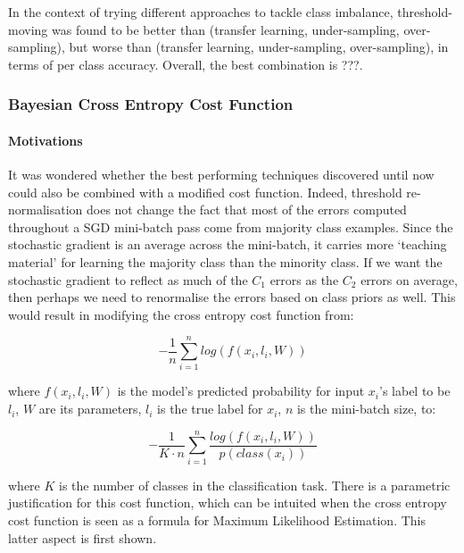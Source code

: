 \documentclass[a4paper,11pt]{article}
\begin{document}
In the context of trying different approaches to tackle class imbalance, threshold-moving was found to be better than (transfer learning, under-sampling, over-sampling), but worse than (transfer learning, under-sampling, over-sampling), in terms of per class accuracy. Overall, the best combination is ???.


\subsubsection{Bayesian Cross Entropy Cost Function}

\paragraph{Motivations}
It was wondered whether the best performing techniques discovered until now could also be combined with a modified cost function. Indeed, threshold re-normalisation does not change the fact that most of the errors computed throughout a SGD mini-batch pass come from majority class examples. Since the stochastic gradient is an average across the mini-batch, it carries more `teaching material' for learning the majority class than the minority class. If we want the stochastic gradient to reflect as much of the $C_1$ errors as the $C_2$ errors on average, then perhaps we need to renormalise the errors based on class priors as well. This would result in modifying the cross entropy cost function from: 

\begin{equation}
-\frac{1}{n}\sum\limits_{i=1}^{n} log(f(x_i,l_i,W))
\end{equation}

where $f(x_i,l_i,W)$ is the model's predicted probability for input $x_i$'s label to be $l_i$, $W$ are its parameters, $l_i$ is the true label for $x_i$, $n$ is the mini-batch size, to:

\begin{equation}
-\frac{1}{K \cdot n}\sum\limits_{i=1}^{n} \frac{log(f(x_i,l_i,W))}{p(class(x_i))} 
\end{equation}

where $K$ is the number of classes in the classification task.
There is a parametric justification for this cost function, which can be intuited when the cross entropy cost function is seen as a formula for Maximum Likelihood Estimation. This latter aspect is first shown. \\
\end{document}
